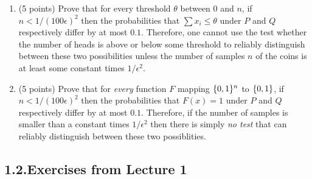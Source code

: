 \documentclass{article}
\begin{document}
\begin{enumerate}[,start=3]
\begin{enumerate}[,label=\Roman*)]
\begin{enumerate}[noitemsep,topsep=\mdcompacttopsep,label=\roman*.]%

\item{}(5 points) Prove that for every threshold $\theta$ between $0$ and $n$, if $n < 1/(100\epsilon)^2$ then the probabilities that $\sum x_i \leq \theta$ under $P$ and $Q$ respectively
differ by at most $0.1$. Therefore, one cannot use the test whether the number of heads is above or below some threshold to reliably distinguish between these two possibilities unless the number
of samples $n$ of the coins is at least some constant times $1/\epsilon^2$.%

\item{}(5 points) Prove that for \emph{every} function $F$ mapping $\{0,1\}^n$ to $\{0,1\}$, if $n < 1/(100\epsilon)^2$ then the probabilities that $F(x)=1$  under $P$ and $Q$ respectively differ by at most $0.1$.
Therefore, if the number of samples is smaller than a constant times $1/\epsilon^2$ then there is simply \emph{no test} that can reliably distinguish between these two possiblities.%
\end{enumerate}%
\end{enumerate}%
\end{enumerate}%

\subsection{1.2.\hspace*{0.5em}Exercises from Lecture 1}\label{sec-exercises-from-lecture-1}%
\end{document}
